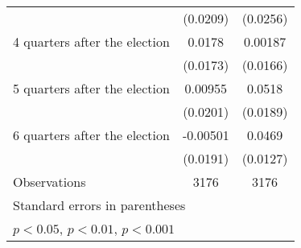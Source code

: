 \begin{table}[htbp]
\begin{tabular}{l*{2}{c}}
                    &    (0.0209)         &    (0.0256)         \\
[1em]
 4 quarters after the election&      0.0178         &     0.00187         \\
                    &    (0.0173)         &    (0.0166)         \\
[1em]
 5 quarters after the election&     0.00955         &      0.0518\sym{**} \\
                    &    (0.0201)         &    (0.0189)         \\
[1em]
 6 quarters after the election&    -0.00501         &      0.0469\sym{***}\\
                    &    (0.0191)         &    (0.0127)         \\
\hline
Observations        &        3176         &        3176         \\
\hline\hline
\multicolumn{3}{l}{\footnotesize Standard errors in parentheses}\\
\multicolumn{3}{l}{\footnotesize \sym{*} \(p<0.05\), \sym{**} \(p<0.01\), \sym{***} \(p<0.001\)}\\
\end{tabular}
\end{table}

